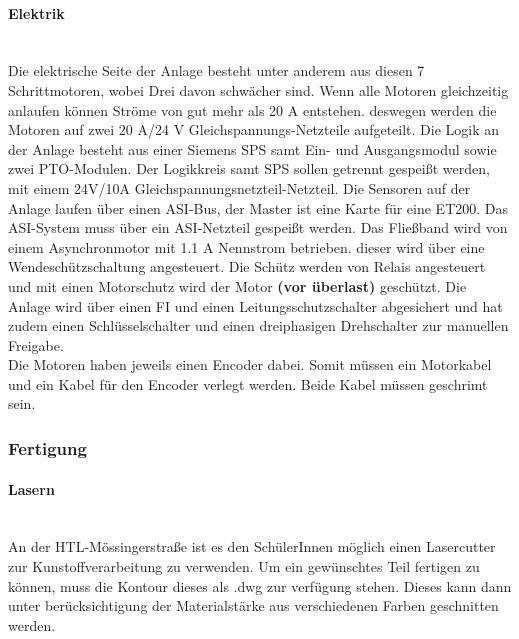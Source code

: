 \paragraph{Elektrik}\mbox{}\\
Die elektrische Seite der Anlage besteht unter anderem aus diesen 7 Schrittmotoren, wobei Drei davon schwächer sind. Wenn alle Motoren gleichzeitig anlaufen können Ströme von gut mehr als 20 A entstehen. deswegen werden die Motoren auf zwei 20 A/24 V Gleichspannungs-Netzteile aufgeteilt. Die Logik an der Anlage besteht aus einer Siemens SPS samt Ein- und Ausgangsmodul sowie zwei PTO-Modulen. Der Logikkreis samt SPS sollen getrennt gespeißt werden, mit einem 24V/10A Gleichspannungsnetzteil-Netzteil. Die Sensoren auf der Anlage laufen über einen ASI-Bus, der Master ist eine Karte für eine ET200. Das ASI-System muss über ein ASI-Netzteil gespeißt werden. Das Fließband wird von einem Asynchronmotor mit 1.1 A Nennstrom betrieben. dieser wird über eine Wendeschützschaltung angesteuert. Die Schütz werden von Relais angesteuert und mit einen Motorschutz wird der Motor \textbf{(vor überlast)} geschützt. Die Anlage wird über einen FI und einen Leitungsschutzschalter abgesichert und hat zudem einen Schlüsselschalter und einen dreiphasigen Drehschalter zur manuellen Freigabe.\\
Die Motoren haben jeweils einen Encoder dabei. Somit müssen ein Motorkabel und ein Kabel für den Encoder verlegt werden. Beide Kabel müssen geschrimt sein. 



\subsubsection{Fertigung}

\paragraph{Lasern}\mbox{}\\
An der HTL-Mössingerstraße ist es den SchülerInnen möglich einen Lasercutter zur Kunstoffverarbeitung zu verwenden. Um ein gewünschtes Teil fertigen zu können, muss die Kontour dieses als .dwg zur verfügung stehen. Dieses kann dann unter berücksichtigung der Materialstärke aus verschiedenen Farben geschnitten werden.


